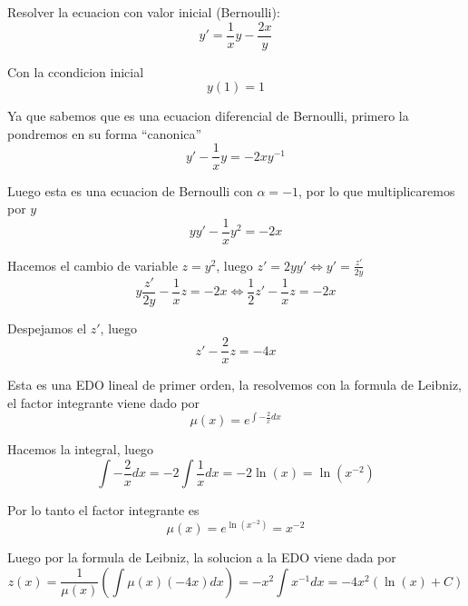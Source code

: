 \documentclass[a4paper,oneside,10.5pt]{article}
\begin{document}
\begin{prob}[control]
  Resolver la ecuacion con valor inicial (Bernoulli):
  \begin{equation*}
    y' = \frac{1}{x}y - \frac{2x}{y}
  \end{equation*}

  Con la ccondicion inicial
  \begin{equation*}
    y(1) = 1
  \end{equation*}

\end{prob}
\begin{sol}
  Ya que sabemos que es una ecuacion diferencial de Bernoulli, primero la pondremos en su forma ``canonica''
  \begin{equation*}
    y' - \frac{1}{x}y = -2x y^{-1}
  \end{equation*}

  Luego esta es una ecuacion de Bernoulli con $\alpha = -1$, por lo que multiplicaremos por $y$
  \begin{equation*}
    yy' - \frac{1}{x}y^{2} = -2x
  \end{equation*}

  Hacemos el cambio de variable $z = y^{2}$, luego $z' = 2yy' \iff y' = \frac{z'}{2y}$
  \begin{equation*}
    y \frac{z'}{2y} - \frac{1}{x} z = -2x \iff \frac{1}{2}z' - \frac{1}{x}z = -2x
  \end{equation*}

  Despejamos el $z'$, luego
  \begin{equation*}
    z' - \frac{2}{x}z = -4x
  \end{equation*}

  Esta es una EDO lineal de primer orden, la resolvemos con la formula de Leibniz, el factor integrante viene dado por
  \begin{equation*}
    \mu(x) = e^{\int -\frac{2}{x} dx}
  \end{equation*}

  Hacemos la integral, luego
  \begin{equation*}
    \int -\frac{2}{x} dx = -2 \int \frac{1}{x} dx = -2 \ln (x) = \ln(x^{-2})
  \end{equation*}

  Por lo tanto el factor integrante es
  \begin{equation*}
    \mu(x) = e^{\ln(x^{-2})} = x^{-2}
  \end{equation*}

  Luego por la formula de Leibniz, la solucion a la EDO viene dada por
  \begin{equation*}
    z(x) = \frac{1}{\mu(x)}(\int \mu(x)(-4x) dx) = -x^{2}\int x^{-1} dx = -4x^{2} (\ln(x) + C)
  \end{equation*}


\end{sol}
\end{document}
